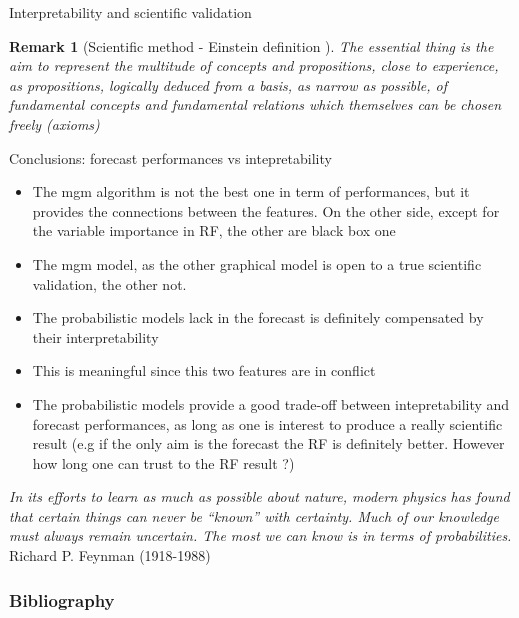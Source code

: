 \documentclass{beamer}
\newtheorem*{remark}{Remark}
\begin{document}
\begin{frame}{Interpretability and scientific validation}

\begin{remark}[Scientific method - Einstein definition ]
The essential thing is the aim to represent the multitude of concepts and propositions, close to experience, as propositions, logically deduced from a basis, as narrow as possible, of fundamental concepts and fundamental relations which themselves can be chosen freely (axioms) \cite{physics-reality}
\end{remark}

\end{frame}


\begin{frame}{Conclusions: forecast performances vs intepretability}
\begin{itemize}
\item The mgm algorithm is not the best one in term of performances, but it provides the connections between the features. On the other side, except for the variable importance in RF, the other are black box one
\item The mgm model, as the other graphical model is open to a true scientific validation, the other not. 
\item The probabilistic models lack in the forecast is definitely compensated by their interpretability 
\item This is meaningful since this two features are in conflict 
\item The probabilistic models provide a good trade-off between intepretability and forecast performances, as long as one is interest to produce a really scientific result (e.g if the only aim is the forecast the RF is definitely better. However how long one can trust to the RF result ?)
\end{itemize}
\end{frame}

\begin{frame}

{\Large \textit{In its efforts to learn as much as possible about nature, modern physics has found that certain things can never be “known” with certainty. Much of our knowledge must always remain uncertain. The most we can know is in terms of probabilities.} Richard P. Feynman (1918-1988)}
\end{frame}



\begin{frame}[t,allowframebreaks]
\frametitle{Bibliography}
\printbibliography
\end{frame}
\end{document}

